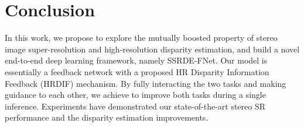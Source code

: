 \documentclass[sigconf]{acmart}
\begin{document}
\section{Conclusion}
In this work, we propose to explore the mutually boosted property of stereo image super-resolution and high-resolution disparity estimation, and build a novel end-to-end deep learning framework, namely SSRDE-FNet. Our model is essentially a feedback network with a proposed HR Disparity Information Feedback (HRDIF) mechanism. By fully interacting the two tasks and making guidance to each other, we achieve to improve both tasks during a single inference. Experiments have demonstrated our state-of-the-art stereo SR performance and the disparity estimation improvements.






\end{document}

